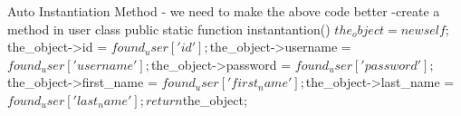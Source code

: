 Auto Instantiation Method
 - we need to make the above code better
 -create a method in user class
    public  static function instantantion()
        {
            $the_object = new self;
            $the_object->id           = $found_user['id'];
            $the_object->username     = $found_user['username'];
            $the_object->password     = $found_user['password'];
            $the_object->first_name   = $found_user['first_name'];
            $the_object->last_name    = $found_user['last_name'];

            return $the_object;
        }